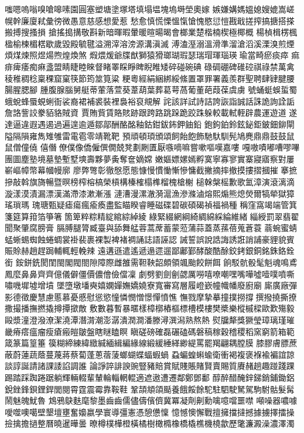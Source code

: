 嗤嗯嗚嗡嗅嗆嗥嗉園圓塞塑塘塗塚塔填塌塭塊塢塒塋奧嫁
嫉嫌媾媽媼媳嫂媲嵩嵯幌幹廉廈弒彙徬微愚意慈感想愛惹
愁愈慎慌慄慍愾愴愧愍愆愷戡戢搓搾搞搪搭搽搬搏搜搔損
搶搖搗搆敬斟新暗暉暇暈暖暄暘暍會榔業楚楷楠楔極椰概
楊楨楫楞楓楹榆楝楣楛歇歲毀殿毓毽溢溯滓溶滂源溝滇滅
溥溘溼溺溫滑準溜滄滔溪溧溴煎煙煩煤煉照煜煬煦煌煥煞
煆煨煖爺牒猷獅猿猾瑯瑚瑕瑟瑞瑁琿瑙瑛瑜當畸瘀痰瘁
痲痱痺痿痴痳盞盟睛睫睦睞督睹睪睬睜睥睨睢矮碎碰碗碘
碌碉硼碑碓硿祺祿禁萬禽稜稚稠稔稟稞窟窠筷節筠筮筧粱
粳粵經絹綑綁綏絛置罩罪署義羨群聖聘肆肄腱腰腸腥腮腳
腫腹腺腦舅艇蒂葷落萱葵葦葫葉葬葛萼萵葡董葩葭葆虞虜
號蛹蜓蜈蜇蜀蛾蛻蜂蜃蜆蜊衙裟裔裙補裘裝裡裊裕裒覜解
詫該詳試詩詰誇詼詣誠話誅詭詢詮詬詹詻訾詨豢貊貉賊資
賈賄貲賃賂賅跡跟跨路跳跺跪跤跦躲較載軾輊辟農運遊道
遂達逼違遐遇遏過遍遑逾遁鄒鄗酬酪酩釉鈷鉗鈸鈽鉀鈾鉛
鉋鉤鉑鈴鉉鉍鉅鈹鈿鉚閘隘隔隕雍雋雉雊雷電雹零靖靴靶
預頑頓頊頒頌飼飴飽飾馳馱馴髡鳩麂鼎⿍鼓⿎鼠⿏僧僮僥
僖僭僚僕像僑僱僎僩兢凳劃劂匱厭嗾嘀嘛嘗嗽嘔嘆嘉嘍
嘎嗷嘖嘟嘈嘐嗶團圖塵塾境墓墊塹墅塽壽夥夢夤奪奩嫡嫦
嫩嫗嫖嫘嫣孵寞寧寡寥實寨寢寤察對屢嶄嶇幛幣幕幗幔廓
廖弊彆彰徹慇愿態慷慢慣慟慚慘慵截撇摘摔撤摸摟摺摑摧
搴摭摻敲斡旗旖暢暨暝榜榨榕槁榮槓構榛榷榻榫榴槐槍榭
槌榦槃榣歉歌氳漳演滾漓滴漩漾漠漬漏漂漢滿滯漆漱漸漲
漣漕漫漯澈漪滬漁滲滌滷熔熙煽熊熄熒爾犒犖獄獐瑤瑣瑪
瑰瑭甄疑瘧瘍瘋瘉瘓盡監瞄睽睿睡磁碟碧碳碩碣禎福禍種
稱窪窩竭端管箕箋筵算箝箔箏箸箇箄粹粽精綻綰綜綽綾
綠緊綴網綱綺綢綿綵綸維緒緇綬罰翠翡翟聞聚肇腐膀膏
膈膊腿膂臧臺與舔舞艋蓉蒿蓆蓄蒙蒞蒲蒜蓋蒸蓀蓓蒐蒼蓑
蓊蜿蜜蜻蜢蜥蜴蜘蝕蜷蜩裳褂裴裹裸製裨褚裯誦誌語誣認
誡誓誤說誥誨誘誑誚誧豪貍貌賓賑賒赫趙趕跼輔輒輕輓辣
遠遘遜遣遙遞遢遝遛鄙鄘鄞酵酸酷酴鉸銬銀銅銘銖鉻銓銜
銨鉼銑閡閨閩閣閥閤隙障際雌雒需靼鞅韶頗領颯颱餃餅餌
餉駁骯骰髦魁魂鳴鳶鳳麼鼻⿐齊⿑億儀僻僵價儂儈儉儅凜
劇劈劉劍劊勰厲嘮嘻嘹嘲嘿嘴嘩噓噎噗噴嘶嘯嘰墀墟增墳
墜墮墩墦奭嬉嫻嬋嫵嬌嬈寮寬審寫層履嶝嶔幢幟幡廢廚廟
廝廣廠彈影德徵慶慧慮慝慕憂慼慰慫慾憧憐憫憎憬憚憤憔
憮戮摩摯摹撞撲撈撐撰撥撓撕撩撒撮播撫撚撬撙撢撳敵
敷數暮暫暴暱樣樟槨樁樞標槽模樓樊槳樂樅槭樑歐歎殤毅
毆漿潼澄潑潦潔澆潭潛潸潮澎潺潰潤澗潘滕潯潠潟熟熬熱
熨牖犛獎獗瑩璋璃瑾璀畿瘠瘩瘟瘤瘦瘡瘢皚皺盤瞎瞇瞌瞑
瞋磋磅確磊碾磕碼磐稿稼穀稽稷稻窯窮箭箱範箴篆篇篁箠
篌糊締練緯緻緘緬緝編緣線緞緩綞緙緲緹罵罷羯翩耦膛膜
膝膠膚膘蔗蔽蔚蓮蔬蔭蔓蔑蔣蔡蔔蓬蔥蓿蔆螂蝴蝶蝠蝦蝸
蝨蝙蝗蝌蝓衛衝褐複褒褓褕褊誼諒談諄誕請諸課諉諂調誰
論諍誶誹諛豌豎豬賠賞賦賤賬賭賢賣賜質賡赭趟趣踫踐踝
踢踏踩踟踡踞躺輝輛輟輩輦輪輜輞輥適遮遨遭遷鄰鄭鄧鄱
醇醉醋醃鋅銻銷鋪鋤鋁銳銼鋒鋇鋰銲閭閱霄霆震霉靠鞍鞋
鞏頡頫頜颳養餓餒餘駝駐駟駛駑駕駒駙骷髮髯鬧魅魄魷魯
鴆鴉鴃麩麾黎墨⿒齒儒儘儔儐儕冀冪凝劑劓勳噙噫噹噩噤
噸噪器噥噱噯噬噢噶壁墾壇壅奮嬝嬴學寰導彊憲憑憩憊懍
憶憾懊懈戰擅擁擋撻撼據擄擇擂操撿擒擔撾整曆曉暹曄曇
暸樽樸樺橙橫橘樹橄橢橡橋橇樵機橈歙歷氅濂澱澡濃澤濁
